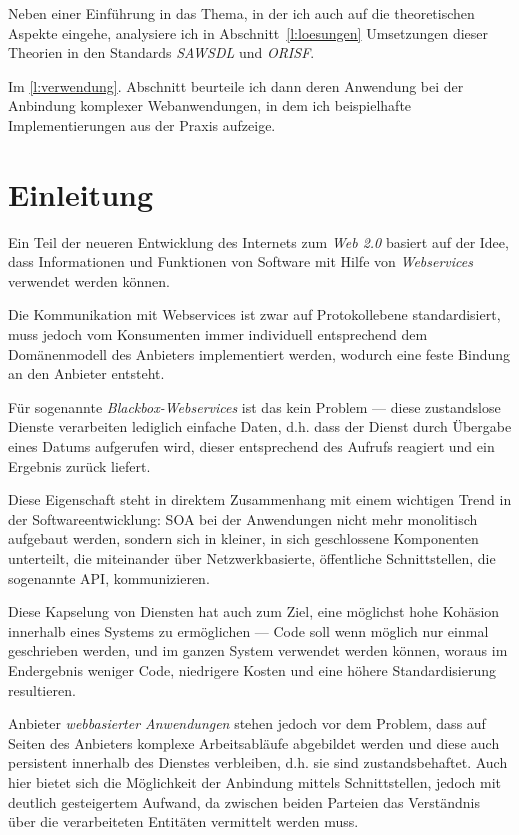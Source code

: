 \documentclass[10pt,a4paper]{article}
\begin{document}
Neben einer Einführung in das Thema, in der ich auch auf die theoretischen Aspekte
eingehe, analysiere ich in Abschnitt~\ref{l:loesungen} Umsetzungen dieser Theorien 
in den Standards \emph{\ac{SAWSDL}} und \emph{\ac{ORISF}}.

Im \ref{l:verwendung}. Abschnitt beurteile ich dann deren Anwendung bei der Anbindung 
komplexer Webanwendungen, in dem ich beispielhafte Implementierungen aus der Praxis aufzeige.

\pagebreak

\tableofcontents

\section{Einleitung}
\label{l:einleitung}

Ein Teil der neueren Entwicklung des Internets zum \emph{Web 2.0} basiert auf der Idee, dass 
Informationen und Funktionen von Software mit Hilfe von \emph{Webservices} verwendet werden 
können.

Die Kommunikation mit Webservices ist zwar auf Protokollebene standardisiert, muss jedoch 
vom Konsumenten immer individuell entsprechend dem Domänenmodell des Anbieters implementiert 
werden, wodurch eine feste Bindung an den Anbieter entsteht. \cite{ka-cots}

Für sogenannte \emph{Blackbox-Webservices} ist das kein Problem --- diese zustandslose Dienste 
verarbeiten lediglich einfache Daten, d.h. dass der Dienst durch Übergabe eines Datums aufgerufen 
wird, dieser entsprechend des Aufrufs reagiert und ein Ergebnis zurück liefert.

Diese Eigenschaft steht in direktem Zusammenhang mit einem wichtigen Trend in der Softwareentwicklung:
\ac{SOA} bei der Anwendungen nicht mehr monolitisch aufgebaut werden, sondern sich in kleiner, in sich 
geschlossene Komponenten unterteilt, die miteinander über Netzwerkbasierte, öffentliche Schnittstellen, 
die sogenannte \ac{API}, kommunizieren.

Diese Kapselung von Diensten hat auch zum Ziel, eine möglichst hohe Kohäsion innerhalb eines Systems 
zu ermöglichen --- Code soll wenn möglich nur einmal geschrieben werden, und im ganzen System verwendet
werden können, woraus im Endergebnis weniger Code, niedrigere Kosten und eine höhere Standardisierung 
resultieren. \cite{hn-web20}


Anbieter \emph{webbasierter Anwendungen} stehen jedoch vor dem Problem, dass auf Seiten des Anbieters 
komplexe Arbeitsabläufe abgebildet werden und diese auch persistent innerhalb des Dienstes verbleiben, 
d.h. sie sind zustandsbehaftet. Auch hier bietet sich die Möglichkeit der Anbindung mittels Schnittstellen, 
jedoch mit deutlich gesteigertem Aufwand, da zwischen beiden Parteien das Verständnis über die verarbeiteten 
Entitäten vermittelt werden muss. 
\end{document}
